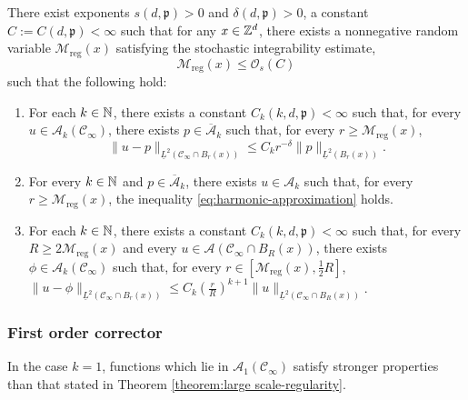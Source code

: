 \documentclass[12pt]{amsart}
\numberwithin{equation}{section}
\begin{document}
	
	\begin{theorem} \label{theorem:large scale-regularity}
		There exist exponents $s(d, \mathfrak{p}) > 0$ and $\delta(d, \mathfrak{p}) > 0$, a constant $C := C(d , \mathfrak{p}) < \infty$ such that for any $x \in \mathbb{Z}^d$, there exists a nonnegative random variable  $\mathcal{M}_{\mathrm{reg}}(x)$  satisfying the stochastic integrability estimate, 
		\begin{equation}
			\mathcal{M}_{\mathrm{reg}}(x) \leq \mathcal{O}_s(C)
		\end{equation}
		such that the following hold:
		\begin{enumerate}[label=(\roman*)]
			\item For each $k \in \operatorname{\mathbb{N}}$, there exists a constant $C_k(k, d, \mathfrak{p}) < \infty$ such that, for every $u \in \mathcal{A}_k(\mathscr{C}_{\infty})$, 
			there exists $p \in \overline{\mathcal{A}}_k$ such that, for every $r \geq   \mathcal{M}_{\mathrm{reg}} (x)$, 
			\begin{equation} \label{eq:harmonic-approximation}
				\| u - p\|_{\underline{L}^2(\mathscr{C}_{\infty} \cap B_r(x))} \leq C_k r^{-\delta} \|p\|_{\underline{L}^2(B_r(x))}.
			\end{equation}
			\item For every $k \in \operatorname{\mathbb{N}}$ and $p \in \overline{\mathcal{A}}_k$, there exists $u \in \mathcal{A}_k$ such that, for every $r \geq   \mathcal{M}_{\mathrm{reg}}(x)$, 
			the inequality \eqref{eq:harmonic-approximation} holds.
			\item For each $k \in \operatorname{\mathbb{N}}$, there exists a constant $C_k(k, d, \mathfrak{p}) < \infty$ such that, for every $R \geq 2 \mathcal{M}_{\mathrm{reg}}(x)$ and every $u \in \mathcal{A}(\mathscr{C}_{\infty} \cap B_R(x))$, there exists $\phi \in \mathcal{A}_k(\mathscr{C}_{\infty})$ such that, for every $r \in [\mathcal{M}_{\mathrm{reg}}(x) , \frac12 R]$, $\| u - \phi \|_{\underline{L}^2(\mathscr{C}_{\infty} \cap B_r(x))} \leq C_k \left( \frac{r}{R} \right)^{k+1} \| u \|_{\underline{L}^2(\mathscr{C}_{\infty} \cap B_R(x))}$. 
		\end{enumerate}
	\end{theorem}
	
	
	\subsubsection{First order corrector}
	In the case $k = 1$,  functions which lie in $\mathcal{A}_1(\mathscr{C}_{\infty})$ satisfy stronger properties than that stated in Theorem \ref{theorem:large scale-regularity}. 
	
\end{document}
